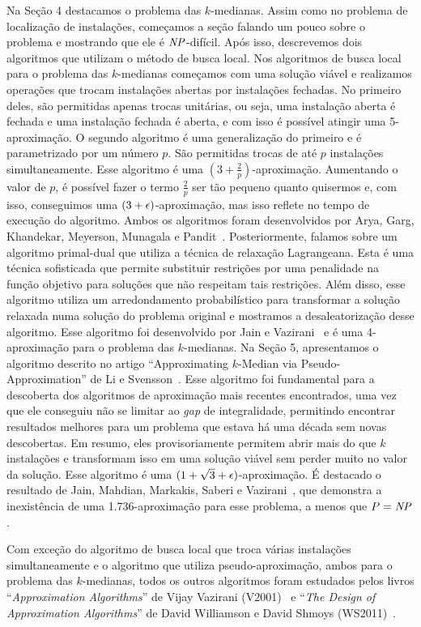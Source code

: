 \documentclass[12pt]{article}
\begin{document}
Na Seção 4 destacamos o problema das $k$-medianas. Assim como no problema de localização de instalações, começamos a seção falando um pouco sobre o problema e mostrando que ele é $\mathit{NP}$-difícil. Após isso, descrevemos dois algoritmos que utilizam o método de busca local. Nos algoritmos de busca local para o problema das $k$-medianas começamos com uma solução viável e realizamos operações que trocam instalações abertas por instalações fechadas. No primeiro deles, são permitidas apenas trocas unitárias, ou seja, uma instalação aberta é fechada e uma instalação fechada é aberta, e com isso é possível atingir uma 5-aproximação. O segundo algoritmo é uma generalização do primeiro e é parametrizado por um número $p$. São permitidas trocas de até $p$ instalações simultaneamente. Esse algoritmo é uma $(3 + \frac{2}{p})$-aproximação. Aumentando o valor de $p$, é possível fazer o termo $\frac{2}{p}$ ser tão pequeno quanto quisermos e, com isso, conseguimos uma $(3 + \epsilon)$-aproximação, mas isso reflete no tempo de execução do algoritmo. Ambos os algoritmos foram desenvolvidos por Arya, Garg, Khandekar, Meyerson, Munagala e Pandit~\cite{AryaLocal}. Posteriormente, falamos sobre um algoritmo primal-dual que utiliza a técnica de relaxação Lagrangeana. Esta é uma técnica sofisticada que permite substituir restrições por uma penalidade na função objetivo para soluções que não respeitam tais restrições. Além disso, esse algoritmo utiliza um arredondamento probabilístico para transformar a solução relaxada numa solução do problema original e mostramos a desaleatorização desse algoritmo. Esse algoritmo foi desenvolvido por Jain e Vazirani~\cite{JV} e é uma 4-aproximação para o problema das $k$-medianas. Na Seção 5, apresentamos o algoritmo descrito no artigo ``Approximating $k$-Median via Pseudo-Approximation'' de Li e Svensson~\cite{li2012}. Esse algoritmo foi fundamental para a descoberta dos algoritmos de aproximação mais recentes encontrados, uma vez que ele conseguiu não se limitar ao \emph{gap} de integralidade, permitindo encontrar resultados melhores para um problema que estava há uma década sem novas descobertas. Em resumo, eles provisoriamente permitem abrir mais do que $k$ instalações e transformam isso em uma solução viável sem perder muito no valor da solução. Esse algoritmo é uma $(1 + \sqrt{3} + \epsilon)$-aproximação.
É destacado o resultado de Jain, Mahdian, Markakis, Saberi e Vazirani~\cite{jain2002greedy}, que demonstra a inexistência de uma 1.736-aproximação para esse problema, a menos que $P=\mathit{NP}$.

Com exceção do algoritmo de busca local que troca várias instalações simultaneamente e o algoritmo que utiliza pseudo-aproximação, ambos para o problema das $k$-medianas, todos os outros algoritmos foram estudados pelos livros ``\emph{Approximation Algorithms}'' de Vijay Vazirani (V2001)~\cite{books/Vazirani} e ``\emph{The Design of Approximation Algorithms}'' de David Williamson e David Shmoys (WS2011)~\cite{books/WS}.
\end{document}
